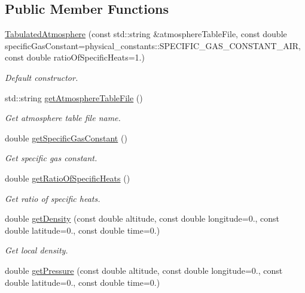 \subsection*{Public Member Functions}
\begin{DoxyCompactItemize}
\item 
\hyperlink{classtudat_1_1aerodynamics_1_1TabulatedAtmosphere_aa15a453668c8ef9612de36cec985d34a}{Tabulated\+Atmosphere} (const std\+::string \&atmosphere\+Table\+File, const double specific\+Gas\+Constant=physical\+\_\+constants\+::\+S\+P\+E\+C\+I\+F\+I\+C\+\_\+\+G\+A\+S\+\_\+\+C\+O\+N\+S\+T\+A\+N\+T\+\_\+\+A\+IR, const double ratio\+Of\+Specific\+Heats=1.)
\begin{DoxyCompactList}\small\item\em Default constructor. \end{DoxyCompactList}\item 
std\+::string \hyperlink{classtudat_1_1aerodynamics_1_1TabulatedAtmosphere_a804bfc3e038c22daf5f05637916504fd}{get\+Atmosphere\+Table\+File} ()
\begin{DoxyCompactList}\small\item\em Get atmosphere table file name. \end{DoxyCompactList}\item 
double \hyperlink{classtudat_1_1aerodynamics_1_1TabulatedAtmosphere_a3c0c4cee0c28f9d65274d670d2ebd5cc}{get\+Specific\+Gas\+Constant} ()
\begin{DoxyCompactList}\small\item\em Get specific gas constant. \end{DoxyCompactList}\item 
double \hyperlink{classtudat_1_1aerodynamics_1_1TabulatedAtmosphere_af9b86a6ff7676ac08a194f51070a1793}{get\+Ratio\+Of\+Specific\+Heats} ()
\begin{DoxyCompactList}\small\item\em Get ratio of specific heats. \end{DoxyCompactList}\item 
double \hyperlink{classtudat_1_1aerodynamics_1_1TabulatedAtmosphere_a6185309cb023348803588eed3d80398b}{get\+Density} (const double altitude, const double longitude=0., const double latitude=0., const double time=0.)
\begin{DoxyCompactList}\small\item\em Get local density. \end{DoxyCompactList}\item 
double \hyperlink{classtudat_1_1aerodynamics_1_1TabulatedAtmosphere_a10a02961cbbf78570db466eee69d3778}{get\+Pressure} (const double altitude, const double longitude=0., const double latitude=0., const double time=0.)

\end{DoxyCompactItemize}
